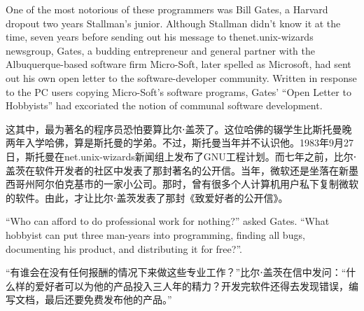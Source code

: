 \ifdefined\eng
One of the most notorious of these programmers was Bill Gates, a Harvard dropout two years Stallman's junior. Although Stallman didn't know it at the time, seven years before sending out his message to thenet.unix-wizards newsgroup, Gates, a budding entrepreneur and general partner with the Albuquerque-based software firm Micro-Soft, later spelled as Microsoft, had sent out his own open letter to the software-developer community. Written in response to the PC users copying Micro-Soft's software programs, Gates' ``Open Letter to Hobbyists'' had excoriated the notion of communal software development.
\fi

\ifdefined\chs
这其中，最为著名的程序员恐怕要算比尔⋅盖茨了。这位哈佛的辍学生比斯托曼晚两年入学哈佛，算是斯托曼的学弟。不过，斯托曼当年并不认识他。1983年9月27日，斯托曼在net.unix-wizards新闻组上发布了GNU工程计划。而七年之前，比尔⋅盖茨在软件开发者的社区中发表了那封著名的公开信。当年，微软还是坐落在新墨西哥州阿尔伯克基市的一家小公司。那时，曾有很多个人计算机用户私下复制微软的软件。由此，才让比尔⋅盖茨发表了那封《致爱好者的公开信》。
\fi

\ifdefined\eng
``Who can afford to do professional work for nothing?'' asked Gates. ``What hobbyist can put three man-years into programming, finding all bugs, documenting his product, and distributing it for free?''.
\fi

\ifdefined\chs
``有谁会在没有任何报酬的情况下来做这些专业工作？''比尔⋅盖茨在信中发问：``什么样的爱好者可以为他的产品投入三人年的精力？开发完软件还得去发现错误，编写文档，最后还要免费发布他的产品。''
\fi

